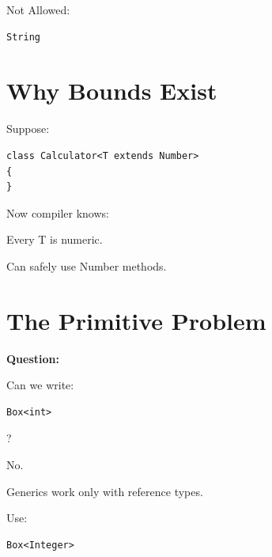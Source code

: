 \documentclass[11pt,a4paper]{book}
\begin{document}

Not Allowed:

\begin{verbatim}
String
\end{verbatim}


\section{Why Bounds Exist}

Suppose:

\begin{verbatim}
class Calculator<T extends Number>
{
}
\end{verbatim}


Now compiler knows:


Every T is numeric.


Can safely use Number methods.


\section{The Primitive Problem}

\textbf{Question:}

Can we write:

\begin{verbatim}
Box<int>
\end{verbatim}

?


No.


Generics work only with reference types.


Use:

\begin{verbatim}
Box<Integer>
\end{verbatim}
\end{document}
